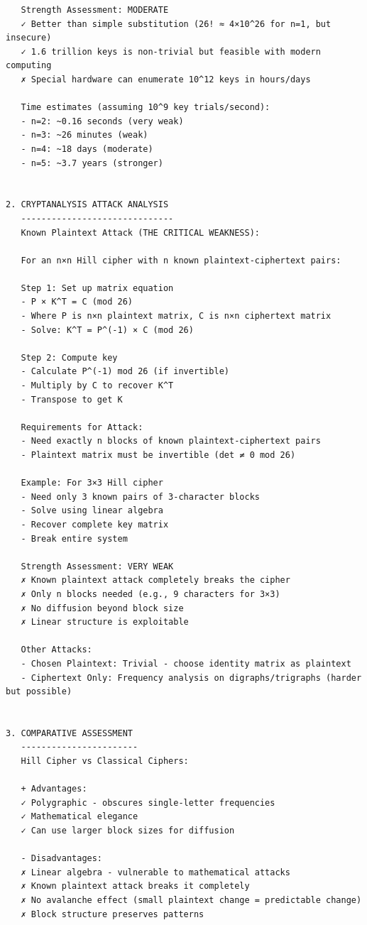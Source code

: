 \documentclass[a4paper,12pt]{article}
\begin{document}
\begin{verbatim}
   Strength Assessment: MODERATE
   ✓ Better than simple substitution (26! ≈ 4×10^26 for n=1, but insecure)
   ✓ 1.6 trillion keys is non-trivial but feasible with modern computing
   ✗ Special hardware can enumerate 10^12 keys in hours/days
   
   Time estimates (assuming 10^9 key trials/second):
   - n=2: ~0.16 seconds (very weak)
   - n=3: ~26 minutes (weak)
   - n=4: ~18 days (moderate)
   - n=5: ~3.7 years (stronger)


2. CRYPTANALYSIS ATTACK ANALYSIS
   ------------------------------
   Known Plaintext Attack (THE CRITICAL WEAKNESS):
   
   For an n×n Hill cipher with n known plaintext-ciphertext pairs:
   
   Step 1: Set up matrix equation
   - P × K^T = C (mod 26)
   - Where P is n×n plaintext matrix, C is n×n ciphertext matrix
   - Solve: K^T = P^(-1) × C (mod 26)
   
   Step 2: Compute key
   - Calculate P^(-1) mod 26 (if invertible)
   - Multiply by C to recover K^T
   - Transpose to get K
   
   Requirements for Attack:
   - Need exactly n blocks of known plaintext-ciphertext pairs
   - Plaintext matrix must be invertible (det ≠ 0 mod 26)
   
   Example: For 3×3 Hill cipher
   - Need only 3 known pairs of 3-character blocks
   - Solve using linear algebra
   - Recover complete key matrix
   - Break entire system
   
   Strength Assessment: VERY WEAK
   ✗ Known plaintext attack completely breaks the cipher
   ✗ Only n blocks needed (e.g., 9 characters for 3×3)
   ✗ No diffusion beyond block size
   ✗ Linear structure is exploitable
   
   Other Attacks:
   - Chosen Plaintext: Trivial - choose identity matrix as plaintext
   - Ciphertext Only: Frequency analysis on digraphs/trigraphs (harder but possible)


3. COMPARATIVE ASSESSMENT
   -----------------------
   Hill Cipher vs Classical Ciphers:
   
   + Advantages:
   ✓ Polygraphic - obscures single-letter frequencies
   ✓ Mathematical elegance
   ✓ Can use larger block sizes for diffusion
   
   - Disadvantages:
   ✗ Linear algebra - vulnerable to mathematical attacks
   ✗ Known plaintext attack breaks it completely
   ✗ No avalanche effect (small plaintext change = predictable change)
   ✗ Block structure preserves patterns



\end{verbatim}
\end{document}
